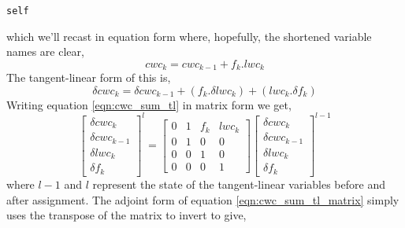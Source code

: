 \begin{alltt}
  self%iVar%cwc_sum(k) = self%iVar%cwc_sum(k-1) + (self%Cloud_Fraction(k) * self%iVar%lwc(k))
\end{alltt}
which we'll recast in equation form where, hopefully, the shortened variable names are clear,
\begin{equation}
  cwc_k = cwc_{k-1} + f_k.lwc_k
  \label{eqn:cwc_sum}
\end{equation}
The tangent-linear form of this is,
\begin{equation}
  \delta cwc_k = \delta cwc_{k-1} + (f_k.\delta lwc_k) + (lwc_k.\delta f_k)
  \label{eqn:cwc_sum_tl}
\end{equation}
Writing equation \ref{eqn:cwc_sum_tl} in matrix form we get,
\begin{equation}
  \left[ 
    \begin{array}{c}
      \delta cwc_k \\
      \delta cwc_{k-1} \\
      \delta lwc_k \\
      \delta f_k
    \end{array}
  \right]^{l} =
  \left[ 
    \begin{array}{cccc}
      0 & 1 & f_k & lwc_k \\
      0 & 1 & 0   & 0 \\
      0 & 0 & 1   & 0 \\
      0 & 0 & 0   & 1
    \end{array}
  \right]
  \left[ 
    \begin{array}{c}
      \delta cwc_k \\
      \delta cwc_{k-1} \\
      \delta lwc_k \\
      \delta f_k
    \end{array}
  \right]^{l-1}
  \label{eqn:cwc_sum_tl_matrix}
\end{equation}
where $l-1$ and $l$ represent the state of the tangent-linear variables before and after assignment. The adjoint form of equation \ref{eqn:cwc_sum_tl_matrix} simply uses the transpose of the matrix to invert to give,
